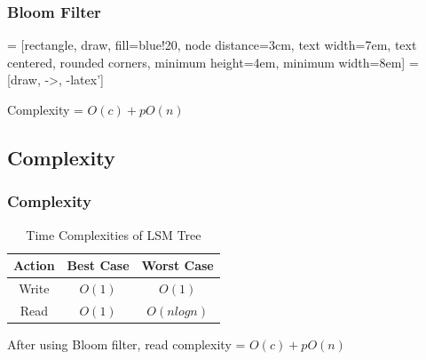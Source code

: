 \documentclass[
	11pt, 
]{beamer}
\begin{document}
\begin{frame}
    \frametitle{Bloom Filter}
     = [rectangle, draw, fill=blue!20, node distance=3cm,
    text width=7em, text centered, rounded corners, minimum height=4em, minimum width=8em]
     = [draw, ->, -latex']
        \begin{center}
            
\begin{boxD}
Complexity = $O(c) + pO(n)$
\end{boxD}
\end{center}

\end{frame}
\subsection{Complexity}

\begin{frame}
    \frametitle{Complexity}
    \begin{table}[h!]
        \centering
        \begin{tabular}{|c|c|c|}
            \hline
           Action  &  Best Case & Worst Case\\
           \hline
           Write  & $O(1)$ & $O(1)$ \\
           Read  & $O(1)$ & $O(nlogn)$\\
           \hline
        \end{tabular}
        \caption{Time Complexities of LSM Tree}
        \label{tab:my_label}
    \end{table}
    \begin{boxD}
After using Bloom filter, read complexity = $O(c) + pO(n)$
\end{boxD}
\end{frame}

\end{document}
